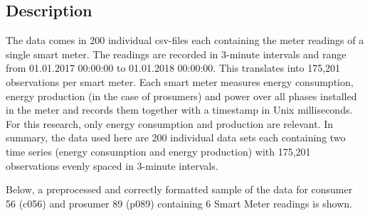 
\subsection{Description}\label{Sec:Data;Subsec:Description}

The data comes in 200 individual csv-files each containing the meter readings of a single smart meter. The readings are recorded in 3-minute intervals and range from 01.01.2017 00:00:00 to 01.01.2018 00:00:00. This translates into 175,201 observations per smart meter. Each smart meter measures energy consumption,  energy production (in the case of prosumers) and power over all phases installed in the meter and records them together with a timestamp in Unix milliseconds. For this research, only energy consumption and production are relevant. In summary, the data used here are 200 individual data sets each containing two time series (energy consumption and energy production) with 175,201 observations evenly spaced in 3-minute intervals.

Below, a preprocessed and correctly formatted sample of the data for consumer 56 (c056) and prosumer 89 (p089) containing 6 Smart Meter readings is shown.

